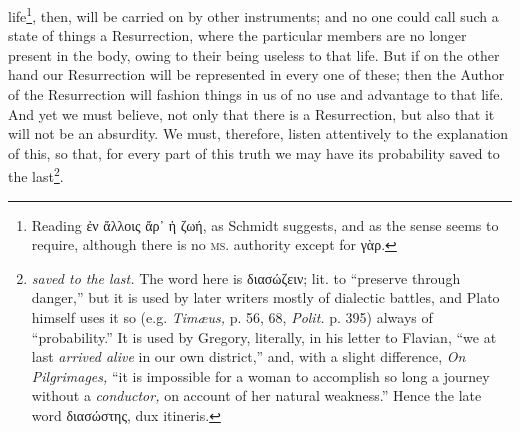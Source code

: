 life\footnote{Reading \textgreek{ἐν ἄλλοις ἄρ᾽ ἡ ζωή}, as Schmidt suggests, and as the sense seems to require, although there is no \textsc{ms.} authority except for \textgreek{γὰρ}.}, then, will be carried on by other instruments; and no one could call such a state of things a Resurrection, where the particular members are no longer present in the body, owing to their being useless to that life. But if on the other hand our Resurrection will be represented in every one of these; then the Author of the Resurrection will fashion things in us of no use and advantage to that life. And yet we must believe, not only that there is a Resurrection, but also that it will not be an absurdity. We must, therefore, listen attentively to the explanation of this, so that, for every part of this truth we may have its probability saved to the last\footnote{\emph{saved to the last.} The word here is \textgreek{διασώζειν}; lit. to “preserve through danger,” but it is used by later writers mostly of dialectic battles, and Plato himself uses it so (e.g. \emph{Timæus,} p. 56, 68, \emph{Polit.} p. 395) always of “probability.” It is used by Gregory, literally, in his letter to Flavian, “we at last \emph{arrived alive} in our own district,” and, with a slight difference, \emph{On Pilgrimages,} “it is impossible for a woman to accomplish so long a journey without a \emph{conductor,} on account of her natural weakness.” Hence the late word \textgreek{διασώστης}, dux itineris.}.

